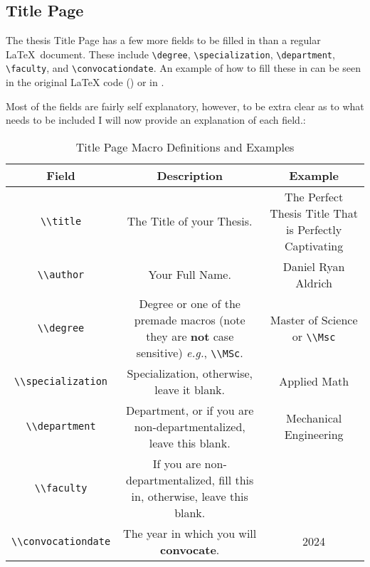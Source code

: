 		\subsection{Title Page}
			The thesis Title Page has a few more fields to be filled in than a regular \LaTeX\ document.
			These include \lstinline|\degree|, \lstinline|\specialization|, \lstinline|\department|, \lstinline|\faculty|, and \lstinline|\convocationdate|.
			An example of how to fill these in can be seen in the original \LaTeX{} code () or in .

			Most of the fields are fairly self explanatory, however, to be extra clear as to what needs to be included I will now provide an explanation of each field.:

			\begin{table}[H]
			\caption{Title Page Macro Definitions and Examples}
			\label{tab:titlePage}
			\begin{tabularx}{0.9\textwidth}{cCC}
				\toprule
					\textbf{Field} & \textbf{Description} & \textbf{Example}\\
				\midrule
					\lstinline|\\title|  & The Title of your Thesis. & The Perfect Thesis Title That is Perfectly Captivating\\
					\lstinline|\\author| & Your Full Name. & Daniel Ryan Aldrich\\
					\lstinline|\\degree| & Degree or one of the premade macros (note they are \textbf{not} case sensitive) \textit{e.g.}, \lstinline|\\MSc|. & Master of Science or \lstinline|\\Msc|\\
					\lstinline|\\specialization| & Specialization, otherwise, leave it blank. & Applied Math\\
					\lstinline|\\department| & Department, or if you are non-departmentalized, leave this blank. & Mechanical Engineering\\
					\lstinline|\\faculty| & If you are non-departmentalized, fill this in, otherwise, leave this blank. & \\
					\lstinline|\\convocationdate| & The year in which you will \textbf{convocate}. & 2024\\
				\bottomrule
			\end{tabularx}
			\end{table}

